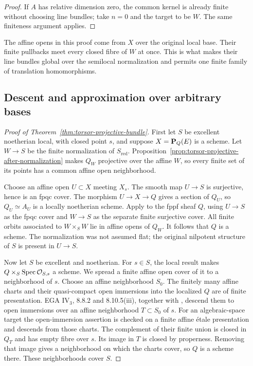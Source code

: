 \begin{proof}
If $A$ has relative dimension zero, the common kernel is
already finite without choosing line bundles; take $n=0$
and the target to be $W$. The same finiteness argument applies.
\end{proof}

The affine opens in this proof come from $X$ over the original
local base. Their finite pullbacks meet every closed fibre of
$W$ at once. This is what makes their line bundles global over
the semilocal normalization and permits one finite family of
translation homomorphisms.

\subsection{Descent and approximation over arbitrary bases}

\begin{proof}[Proof of Theorem~\ref{thm:torsor-projective-bundle}]
First let $S$ be excellent noetherian local, with closed point
$s$, and suppose $X=\mathbf P_Q(E)$ is a scheme. Let $W\to S$ be the
finite normalization of $S_{\mathrm{red}}$.
Proposition~\ref{prop:torsor-projective-after-normalization}
makes $Q_W$ projective over the affine $W$, so every finite
set of its points has a common affine open neighborhood.

Choose an affine open $U\subset X$ meeting $X_s$.
The smooth map $U\to S$ is surjective, hence is an fpqc cover.
The morphism $U\to X\to Q$ gives a section of $Q_U$, so
$Q_U\simeq A_U$ is a locally noetherian scheme.
Apply \cite[Theorem~4.2]{RaynaudDescent} to the fppf sheaf $Q$,
using $U\to S$ as the fpqc cover and $W\to S$ as the separate
finite surjective cover. All finite orbits associated to
$W\times_S W$ lie in affine opens of $Q_W$. It follows that
$Q$ is a scheme. The normalization was not assumed flat;
the original nilpotent structure of $S$ is present in
$U\to S$.

Now let $S$ be excellent and noetherian. For $s\in S$, the
local result makes $Q\times_S\operatorname{Spec}\mathcal O_{S,s}$ a scheme.
We spread a finite affine open cover of it to a neighborhood
of $s$. Choose an affine neighborhood $S_0$.
The finitely many affine charts and their quasi-compact open
immersions into the localized $Q$ are of finite presentation.
EGA IV$_3$, 8.8.2 and 8.10.5(iii), together with
\cite[Tag~07SK]{Stacks}, descend them to open immersions over
an affine neighborhood $T\subset S_0$ of $s$.
For an algebraic-space target the open-immersion assertion is
checked on a finite affine \'etale presentation and descends
from those charts. The complement of their finite union is
closed in $Q_T$ and has empty fibre over $s$. Its image in
$T$ is closed by properness. Removing that image gives a
neighborhood on which the charts cover, so $Q$ is a scheme
there. These neighborhoods cover $S$.


\end{proof}
